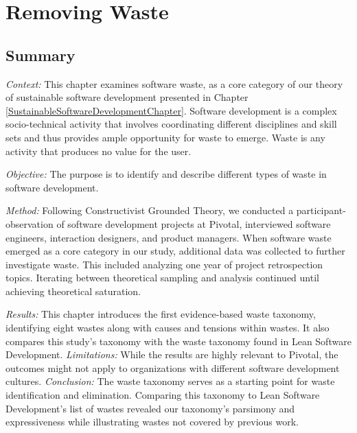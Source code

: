 
\chapter{Removing Waste}
\label{SoftwareEngineeringWasteChapter}
\section{Summary}

\textit{Context:} This chapter examines software waste, as a core category of our theory of sustainable software development presented in Chapter \ref{SustainableSoftwareDevelopmentChapter}. Software development is a complex socio-technical activity that involves coordinating different disciplines and skill sets and thus provides ample opportunity for waste to emerge. Waste is any activity that produces no value for the user.

\textit{Objective:} The purpose is to identify and describe different types of waste in software development.

\textit{Method:} Following Constructivist Grounded Theory, we conducted a \durationOfResearchStudy{} participant-observation of \numberOfObservedProjects{} software development projects at Pivotal, interviewed \numberOfInterviews{} software engineers, interaction designers, and product managers. When software waste emerged as a core category in our study, additional data was collected to further investigate waste. This included analyzing one year of project retrospection topics. Iterating between theoretical sampling and analysis continued until achieving theoretical saturation.

\textit{Results:}  This chapter introduces the first evidence-based waste taxonomy, identifying eight wastes along with causes and tensions within wastes. It also compares this study's taxonomy with the waste taxonomy found in Lean Software Development.
\textit{Limitations:} While the results are highly relevant to Pivotal, the outcomes might not apply to organizations with different software development cultures.
\textit{Conclusion:} The waste taxonomy serves as a starting point for waste identification and elimination. Comparing this taxonomy to Lean Software Development's list of wastes revealed our taxonomy's parsimony and expressiveness while illustrating wastes not covered by previous work. 

